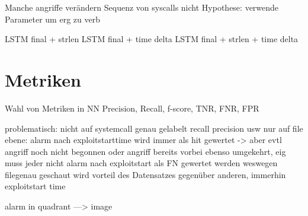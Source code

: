 Manche angriffe verändern Sequenz von syscalls nicht
Hypothese:
verwende Parameter um erg zu verb

LSTM final + strlen
LSTM final + time delta
LSTM final + strlen + time delta



\section{Metriken}

Wahl von Metriken in NN
Precision, Recall, f-score, TNR, FNR, FPR

problematisch:
nicht auf systemcall genau gelabelt
recall precision usw nur auf file ebene:
alarm nach exploitstarttime wird immer als hit gewertet -> aber evtl angriff noch nicht begonnen
oder angriff bereits vorbei
ebenso umgekehrt, eig muss jeder nicht alarm nach exploitstart als FN gewertet werden
weswegen filegenau geschaut wird
vorteil des Datensatzes gegenüber anderen, immerhin exploitstart time

alarm in quadrant ---> image





